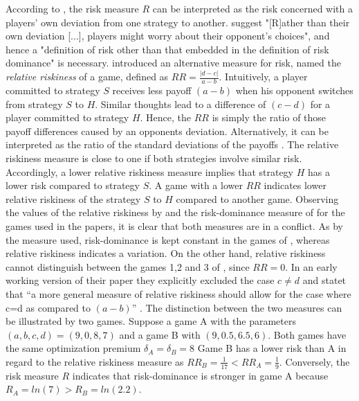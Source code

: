 According to \textcite{rydval_loss_2005}, the risk measure $R$ 
can be interpreted as the risk concerned with a players' 
own deviation from one strategy to another.
\textcite[19]{rydval_loss_2005} suggest "[R]ather than their
own deviation [...], players might worry about their opponent's choices", 
and hence a "definition of risk other than that embedded in the definition
of risk dominance" is necessary.
\textcite[371]{dubois_optimization_2012} 
introduced an alternative measure for risk, named the 
\textit{relative riskiness} of a game, defined as $RR = \frac{|d-c|}{a-b}$.
Intuitively, a player committed to strategy $S$ receives less payoff $(a-b)$  
when his opponent switches from strategy $S$ to $H$. Similar thoughts lead
to a difference of $(c-d)$ for a player committed to strategy $H$. Hence, the
$RR$ is simply the ratio of those payoff differences caused by an opponents
deviation.
Alternatively, it can be interpreted as the ratio of the 
standard deviations of the payoffs 
\parencite[372]{dubois_optimization_2012}. 
The relative riskiness measure is close to one if both strategies involve
similar risk. 
Accordingly, a lower relative riskiness measure implies that
strategy $H$ has a lower risk compared to strategy $S$.
A game with a lower $RR$ indicates lower relative riskiness of the strategy
$S$ to $H$ compared to another game.
Observing the values of the relative riskiness by 
\textcite{dubois_optimization_2012} and the risk-dominance measure of 
\textcite{schmidt_playing_2003} for the games used in the papers, it is clear
that both measures are in a conflict. As by the measure 
\textcite{schmidt_playing_2003} used, risk-dominance is kept 
constant in the games of  \textcite{battalio_optimization_2001}, 
whereas relative riskiness indicates a variation. 
On the other hand, relative riskiness cannot distinguish between
the games 1,2 and 3 of \textcite{schmidt_playing_2003}, since $RR=0$. In an
early working version of their paper they explicitly excluded the case 
$c \neq d$ and statet that ``a more general measure of relative riskiness 
should allow for the case where c=d as compared to $(a-b)$'' 
\parencite{dubois_optimization_2008}. The distinction between the two
measures can be illustrated by two games. Suppose a game A with the parameters 
$(a,b,c,d) =(9,0,8,7)$ and a game B with $(9,0.5,6.5,6)$. Both games
have the same optimization premium $\delta_A = \delta_B = 8$
Game B has a lower risk than A in regard to the relative riskiness
measure as $RR_B=\frac{1}{17} < RR_A =\frac19$. Conversely, the 
risk measure $R$ indicates that risk-dominance is stronger in game A because
$R_A =ln(7) > R_B=ln(2.2)$.

